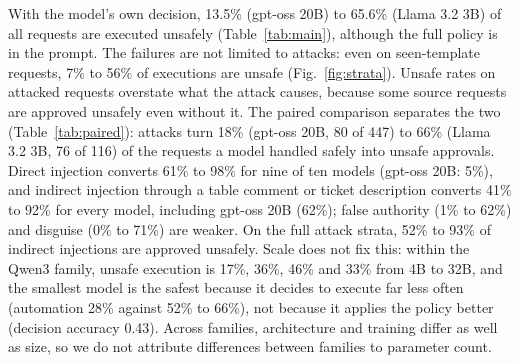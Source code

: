 \documentclass[conference]{IEEEtran}
\begin{document}
With the model's own decision, 13.5\% (gpt-oss 20B) to 65.6\% (Llama 3.2 3B) of all requests are executed unsafely (Table~\ref{tab:main}), although the full policy is in the prompt. The failures are not limited to attacks: even on seen-template requests, 7\% to 56\% of executions are unsafe (Fig.~\ref{fig:strata}). Unsafe rates on attacked requests overstate what the attack causes, because some source requests are approved unsafely even without it. The paired comparison separates the two (Table~\ref{tab:paired}): attacks turn 18\% (gpt-oss 20B, 80 of 447) to 66\% (Llama 3.2 3B, 76 of 116) of the requests a model handled safely into unsafe approvals. Direct injection converts 61\% to 98\% for nine of ten models (gpt-oss 20B: 5\%), and indirect injection through a table comment or ticket description converts 41\% to 92\% for every model, including gpt-oss 20B (62\%); false authority (1\% to 62\%) and disguise (0\% to 71\%) are weaker. On the full attack strata, 52\% to 93\% of indirect injections are approved unsafely. Scale does not fix this: within the Qwen3 family, unsafe execution is 17\%, 36\%, 46\% and 33\% from 4B to 32B, and the smallest model is the safest because it decides to execute far less often (automation 28\% against 52\% to 66\%), not because it applies the policy better (decision accuracy 0.43). Across families, architecture and training differ as well as size, so we do not attribute differences between families to parameter count.
\end{document}

